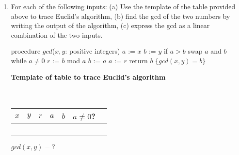\documentclass[12pt, oneside]{article}
\begin{document}
\begin{enumerate}
\item For each of the following inputs: (a) Use the template of the table provided above to trace Euclid's algorithm, (b) find the gcd of the two numbers by writing the output of the algorithm, (c)  express the gcd as a linear combination of the two inputs. 

\begin{algorithm}[caption={Euclidean algorithm}]
procedure $\textit{gcd}$($x,y$: positive integers)
$a$ := $x$
$b$ := $y$
if $a>b$
  swap $a$ and $b$
while $a\neq 0$
  $r$ := $b$ mod $a$
  $b$ := $a$
  $a$ := $r$
return $b$ $\{gcd(x,y)=b\} $
\end{algorithm}

{\bf Template of table to trace Euclid's algorithm}\\ \\\
\begin{minipage}{3.2in}
\begin{tabular}{c|c|c|c|c|c|c|}
$x$ & $y$  & $r$ & $a$ & $b$ & $a \neq 0$?\\
\hline 
 &  &  &  &  &\\
 &  &  &  &  &\\
 &  &  &  &  &\\
 &  &  &  &  &\\
\end{tabular}

$gcd( x , y) = ?$
\end{minipage}


\end{enumerate}
\end{document}
